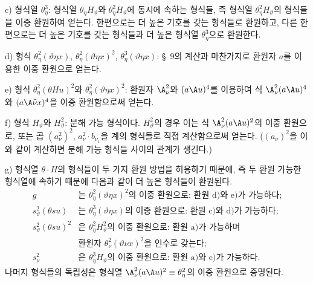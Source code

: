 
c) 형식열 $\theta_\eta^3$: 형식열 $\theta_\eta H_\vartheta$와 $\theta_\eta^2H_\vartheta$에 동시에 속하는 형식들, 즉 형식열 $\theta_\eta^2H_\vartheta$의 형식들을 이중 환원하여 얻는다. 한편으로는 더 높은 기호를 갖는 형식들로 환원하고, 다른 한편으로는 더 높은 기호를 갖는 형식들과 더 높은 형식열 $\theta_\eta^3$으로 환원한다.

d) 형식 $\theta_\eta^2(\vartheta\eta x)$, $\theta_\eta^2(\vartheta\eta x)^2$, $\theta_\eta^3(\vartheta\eta x)$: \S\ 9의 계산과 마찬가지로 환원자 $a$를 이용한 이중 환원으로 얻는다.

e) 형식 $\theta_\eta^2(\theta Hu)^2$와 $\theta_\eta^2(\vartheta\eta x)^2$: 환원자 $\A_\nu^2$와 $(a\A u)^4$를 이용하여 식 $\A_\nu^2(a\A u)^4$와 $(a\A\widehat{\nu}x)^4$을 이중 환원함으로써 얻는다.

f) 형식 $H_\vartheta$와 $H_\vartheta^2$: 분해 가능 형식이다. $H_\vartheta^2$의 경우 이는 식 $\A_\nu^2(a\A u)^2$의 이중 환원으로, 또는 곱 $(a_\nu^2)^2$, $a_\nu^2\cdot b_{\nu_1}$을 계의 형식들로 직접 계산함으로써 얻는다. ($(a_\nu)^2$을 이와 같이 계산하면 분해 가능 형식들 사이의 관계가 생긴다.)

g) 형식열 $\theta\cdot H$의 형식들이 두 가지 환원 방법을 허용하기 때문에, 즉 두 환원 가능한 형식열에 속하기 때문에 다음과 같이 더 높은 형식들이 환원된다.
\[
\begin{array}{rl}
g&\text{는 }\theta_\eta^2(\vartheta\eta x)^2\text{의 이중 환원으로: 환원 d)와 e)가 가능하다;}\\[0.3em]
s_\vartheta^2(\theta s u)&\text{는 }\theta_\eta^3(\vartheta\eta x)\text{의 이중 환원으로: 환원 c)와 d)가 가능하다;}\\[0.3em]
s_\vartheta^2(\theta s u)^2&\text{은 }\theta_\eta^2H_\vartheta^2\text{의 이중 환원으로: 환원 a)가 가능하며}\\
&\text{환원자 }\theta_\nu^2(\vartheta\nu x)^2\text{을 인수로 갖는다;}\\[0.3em]
s_\nu^2&\text{은 }\theta_\eta^3H_\vartheta\text{의 이중 환원으로: 환원 a)와 c)가 가능하다.}
\end{array}
\]
나머지 형식들의 독립성은 형식열 $\A_\nu^2(a\A u)^2\equiv\theta_\eta^2$의 이중 환원으로 증명된다.
